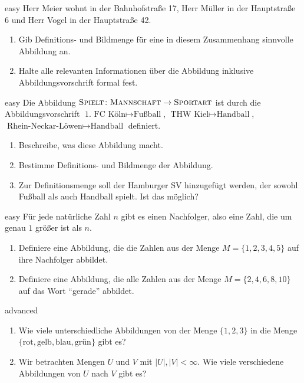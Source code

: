 \documentclass[../funktionen.tex]{subfiles}
\begin{document}
\begin{exercise}{easy}
    Herr Meier wohnt in der Bahnhofstraße 17, Herr Müller in der Hauptstraße 6 und Herr Vogel in der Hauptstraße 42.
    \begin{enumerate}
        \item Gib Definitions- und Bildmenge für eine in diesem Zusammenhang sinnvolle Abbildung an.
        \item Halte alle relevanten Informationen über die Abbildung inklusive Abbildungsvorschrift formal fest.
    \end{enumerate}
\end{exercise}

\begin{exercise}{easy}
    Die Abbildung $\textsc{Spielt}\colon\textsc{Mannschaft}\rightarrow\textsc{Sportart}$ ist durch die Abbildungsvorschrift $\text{1. FC Köln}\mapsto\text{Fußball}$, $\text{THW Kiel}\mapsto\text{Handball}$, $\text{Rhein-Neckar-Löwen}\mapsto\text{Handball}$ definiert.
    \begin{enumerate}
        \item Beschreibe, was diese Abbildung macht.
        \item Bestimme Definitions- und Bildmenge der Abbildung.
        \item Zur Definitionsmenge soll der Hamburger SV hinzugefügt werden, der sowohl Fußball als auch Handball spielt. Ist das möglich?
    \end{enumerate}
\end{exercise}

\begin{exercise}{easy}
    Für jede natürliche Zahl $n$ gibt es einen Nachfolger, also eine Zahl, die um genau $1$ größer ist als $n$. 
    \begin{enumerate}
        \item Definiere eine Abbildung, die die Zahlen aus der Menge $M=\{1,2,3,4,5\}$ auf ihre Nachfolger abbildet.
        \item Definiere eine Abbildung, die alle Zahlen aus der Menge $M=\{2,4,6,8,10\}$ auf das Wort \enquote{gerade} abbildet.
    \end{enumerate}
\end{exercise}

\begin{exercise}{advanced}
    \begin{enumerate}
        \item Wie viele unterschiedliche Abbildungen von der Menge $\{1,2,3\}$ in die Menge $\{\text{rot},\text{gelb},\text{blau},\text{grün}\}$ gibt es?
        \item Wir betrachten Mengen $U$ und $V$ mit $|U|,|V|<\infty$. Wie viele verschiedene Abbildungen von $U$ nach $V$ gibt es?
    \end{enumerate}
\end{exercise}
\end{document}
